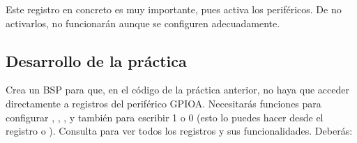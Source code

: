 \documentclass[../main.tex]{subfiles}
\begin{document}
            Este registro en concreto es muy importante, pues activa los periféricos. De no activarlos, no funcionarán aunque se configuren adecuadamente.

    \subsection{Desarrollo de la práctica}
        
        Crea un BSP para que, en el código de la práctica anterior, no haya que acceder directamente a registros del periférico GPIOA. Necesitarás funciones para configurar , , ,  y también para escribir 1 o 0 (esto lo puedes hacer desde el registro  o ). Consulta \REFMAN[6.4] para ver todos los registros y sus funcionalidades. Deberás:
\end{document}
